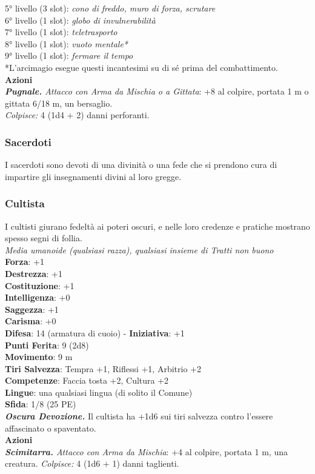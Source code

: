 \begin{multicols}{2}
5° livello (3 slot): \emph{cono di freddo, muro di forza, scrutare}\\
6° livello (1 slot): \emph{globo di invulnerabilità}\\
7° livello (1 slot): \emph{teletrasporto}\\
8° livello (1 slot): \emph{vuoto mentale*}\\
9° livello (1 slot): \emph{fermare il tempo}\\
*L'arcimagio esegue questi incantesimi su di sé prima del  combattimento.\\
\smallskip\textbf{Azioni}\\
\emph{\textbf{Pugnale.} Attacco con Arma da Mischia o a Gittata}: +8 al colpire, portata 1 m o gittata 6/18 m, un bersaglio.\\
\emph{Colpisce:} 4 (1d4 + 2) danni perforanti.\\

\subsubsection{Sacerdoti}
I sacerdoti sono devoti di una divinità o una fede che si prendono cura di impartire gli insegnamenti divini al loro gregge.\\

\subsubsection{Cultista}
I cultisti giurano fedeltà ai poteri oscuri, e nelle loro credenze e pratiche mostrano spesso segni di follia.\\
\emph{Media umanoide (qualsiasi razza), qualsiasi insieme di Tratti non buono}\\
\textbf{Forza}: +1\\
\textbf{Destrezza}: +1\\
\textbf{Costituzione}: +1\\
\textbf{Intelligenza}: +0\\
\textbf{Saggezza}: +1\\
\textbf{Carisma}: +0\\
\textbf{Difesa}: 14 (armatura di cuoio) - \textbf{Iniziativa}: +1\\
\textbf{Punti Ferita}: 9 (2d8)\\
\textbf{Movimento}: 9 m\\
\textbf{Tiri Salvezza}: Tempra +1, Riflessi +1, Arbitrio +2 \\
\textbf{Competenze}: Faccia tosta +2, Cultura +2\\
\textbf{Lingue}: una qualsiasi lingua (di solito il Comune)\\
\textbf{Sfida}: 1/8 (25 PE)\smallskip\\
\emph{\textbf{Oscura Devozione.}} Il cultista ha +1d6 sui tiri salvezza contro l'essere affascinato o spaventato.\\
\smallskip\textbf{Azioni}\\
\emph{\textbf{Scimitarra.} Attacco con Arma da Mischia}: +4 al colpire, portata 1 m, una creatura.
\emph{Colpisce:} 4 (1d6 + 1) danni taglienti.\\


\end{multicols}
